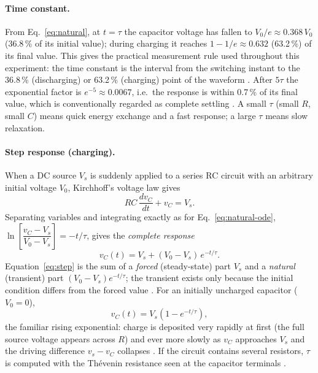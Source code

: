 \documentclass[12pt,a4paper]{article}
\begin{document}
	\paragraph{Time constant.}
	From Eq.~\eqref{eq:natural}, at $t = \tau$ the capacitor voltage has
	fallen to $V_0/e \approx 0.368\,V_0$ (36.8\,\% of its initial value);
	during charging it reaches $1 - 1/e \approx 0.632$ (63.2\,\%) of its
	final value.  This gives the practical measurement rule used
	throughout this experiment: the time constant is the interval from the
	switching instant to the 36.8\,\% (discharging) or 63.2\,\%
	(charging) point of the waveform \cite{boylestad}.  After $5\tau$ the
	exponential factor is $e^{-5} \approx 0.0067$, i.e.\ the response is
	within 0.7\,\% of its final value, which is conventionally regarded
	as complete settling \cite{sadiku}.  A small $\tau$ (small $R$, small
	$C$) means quick energy exchange and a fast response; a large $\tau$
	means slow relaxation.
	
	\paragraph{Step response (charging).}
	When a DC source $V_s$ is suddenly applied to a series RC circuit
	with an arbitrary initial voltage $V_0$, Kirchhoff's voltage law gives
	\begin{equation}
		RC\,\frac{dv_C}{dt} + v_C = V_s .
		\label{eq:step-ode}
	\end{equation}
	Separating variables and integrating exactly as for
	Eq.~\eqref{eq:natural-ode},
	$\ln\!\left[\dfrac{v_C - V_s}{V_0 - V_s}\right] = -t/\tau$, gives the
	\emph{complete response}
	\begin{equation}
		v_C(t) = V_s + (V_0 - V_s)\, e^{-t/\tau}.
		\label{eq:step}
	\end{equation}
	Equation~\eqref{eq:step} is the sum of a \emph{forced}
	(steady-state) part $V_s$ and a \emph{natural} (transient) part
	$(V_0 - V_s)e^{-t/\tau}$; the transient exists only because the
	initial condition differs from the forced value \cite{sadiku}.  For an
	initially uncharged capacitor ($V_0 = 0$),
	\begin{equation}
		v_C(t) = V_s\left(1 - e^{-t/\tau}\right),
		\label{eq:charging}
	\end{equation}
	the familiar rising exponential: charge is deposited very rapidly at
	first (the full source voltage appears across $R$) and ever more
	slowly as $v_C$ approaches $V_s$ and the driving difference
	$v_s - v_C$ collapses \cite{boylestad}.  If the circuit contains
	several resistors, $\tau$ is computed with the Th\'evenin resistance
	seen at the capacitor terminals \cite{sadiku}.
	
\end{document}
